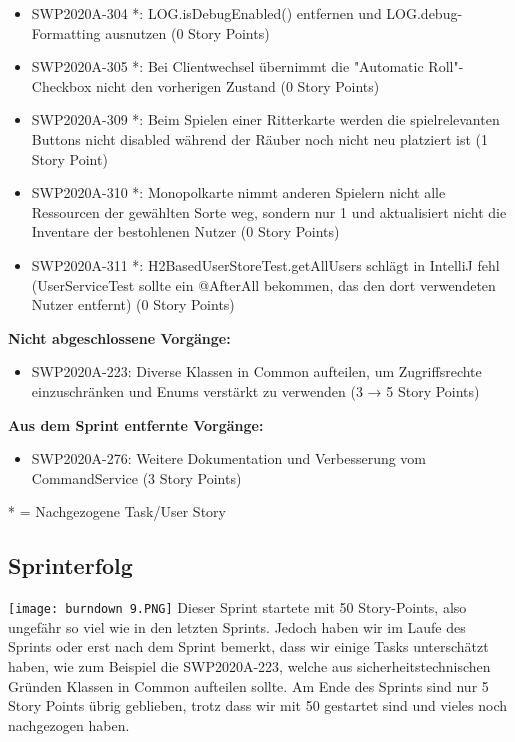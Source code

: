 \documentclass[12pt,a4paper, oneside]{article}
\begin{document}
\begin{itemize}
        \item SWP2020A-304 *: LOG.isDebugEnabled() entfernen und LOG.debug-Formatting ausnutzen (0 Story Points)

        \item SWP2020A-305 *: Bei Clientwechsel übernimmt die "Automatic Roll"-Checkbox nicht den vorherigen Zustand (0 Story Points)

        \item SWP2020A-309 *: Beim Spielen einer Ritterkarte werden die spielrelevanten Buttons nicht disabled während der Räuber noch nicht neu platziert ist (1 Story Point)

        \item SWP2020A-310 *: Monopolkarte nimmt anderen Spielern nicht alle Ressourcen der gewählten Sorte weg, sondern nur 1 und aktualisiert nicht die Inventare der bestohlenen Nutzer (0 Story Points)

        \item SWP2020A-311 *: H2BasedUserStoreTest.getAllUsers schlägt in IntelliJ fehl (UserServiceTest sollte ein @AfterAll bekommen, das den dort verwendeten Nutzer entfernt) (0 Story Points)
    \end{itemize}

    \textbf{Nicht abgeschlossene Vorgänge:}
    \begin{itemize}
        \item SWP2020A-223:	Diverse Klassen in Common aufteilen, um Zugriffsrechte einzuschränken und Enums verstärkt zu verwenden (3 → 5 Story Points)
    \end{itemize}

    \textbf{Aus dem Sprint entfernte Vorgänge:}
    \begin{itemize}
        \item SWP2020A-276:	Weitere Dokumentation und Verbesserung vom CommandService (3 Story Points)
    \end{itemize}


    * = Nachgezogene Task/User Story




    \subsection{Sprinterfolg}
    \texttt{[image: burndown 9.PNG]}
    Dieser Sprint startete mit 50 Story-Points, also ungefähr so viel wie in den letzten Sprints. Jedoch haben wir im Laufe des Sprints oder erst nach dem Sprint bemerkt, dass wir einige Tasks unterschätzt haben, wie zum Beispiel die SWP2020A-223, welche aus sicherheitstechnischen Gründen Klassen in Common aufteilen sollte. Am Ende des Sprints sind nur 5 Story Points übrig geblieben, trotz dass wir mit 50 gestartet sind und vieles noch nachgezogen haben.
\end{document}
